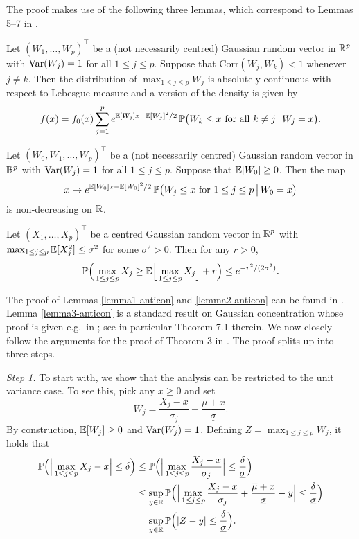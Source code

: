  
The proof makes use of the following three lemmas, which correspond to Lemmas 5--7 in \cite{Chernozhukov2015}. 
\begin{lemmaA}\label{lemma1-anticon}
Let $(W_1,\ldots,W_p)^\top$ be a (not necessarily centred) Gaussian random vector in $\mathbb{R}^p$ with $\textnormal{Var}(W_j) = 1$ for all $1 \le j \le p$. Suppose that $\text{Corr}(W_j,W_k) < 1$ whenever $j \ne k$. Then the distribution of $\max_{1 \le j \le p} W_j$ is absolutely continuous with respect to Lebesgue measure and a version of the density is given by 
\[ f(x) = f_0(x) \sum\limits_{j=1}^p e^{\mathbb{E}[W_j]x - \mathbb{E}[W_j]^2/2} \, \mathbb{P} \big(W_k \le x \text{ for all } k \ne j \, \big| \, W_j = x \big). \]
\end{lemmaA}
\begin{lemmaA}\label{lemma2-anticon}
Let $(W_0,W_1,\ldots,W_p)^\top$ be a (not necessarily centred) Gaussian random vector in $\mathbb{R}^p$ with $\textnormal{Var}(W_j) = 1$ for all $1 \le j \le p$. Suppose that $\mathbb{E}[W_0] \ge 0$. Then the map 
\[ x \mapsto  e^{\mathbb{E}[W_0]x - \mathbb{E}[W_0]^2/2} \, \mathbb{P} \big(W_j \le x \text{ for } 1 \le j \le p \, \big| \, W_0 = x \big) \]
is non-decreasing on $\mathbb{R}$. 
\end{lemmaA}
\begin{lemmaA}\label{lemma3-anticon}
Let $(X_1,\ldots,X_p)^\top$ be a centred Gaussian random vector in $\mathbb{R}^p$ with $\max_{1 \le j \le p} \mathbb{E}[X_j^2] \le \sigma^2$ for some $\sigma^2 > 0$. Then for any $r > 0$, 
\[ \mathbb{P} \Big( \max_{1 \le j \le p} X_j \ge \mathbb{E} \Big[ \max_{1 \le j \le p} X_j \Big] + r \Big) \le e^{-r^2/(2\sigma^2)}. \]
\end{lemmaA} 
The proof of Lemmas \ref{lemma1-anticon} and \ref{lemma2-anticon} can be found in \cite{Chernozhukov2015}. Lemma \ref{lemma3-anticon} is a standard result on Gaussian concentration whose proof is given e.g.\ in \cite{Ledoux2001}; see in particular Theorem 7.1 therein. We now closely follow the arguments for the proof of Theorem 3 in \cite{Chernozhukov2015}. The proof splits up into three steps. 
\vspace{7pt}


\textit{Step 1.} To start with, we show that the analysis can be restricted to the unit variance case. To see this, pick any $x \ge 0$ and set 
\[ W_j = \frac{X_j - x}{\sigma_j} + \frac{\overline{\mu} + x}{\underline{\sigma}}. \]
By construction, $\mathbb{E}[W_j] \ge 0$ and $\textnormal{Var}(W_j) = 1$. Defining $Z = \max_{1 \le j \le p} W_j$, it holds that  
\begin{align*}
\mathbb{P} \Big( \Big| \max_{1 \le j \le p} X_j - x \Big| \le \delta \Big) 
 & \le \mathbb{P} \Big( \Big| \max_{1 \le j \le p} \frac{X_j - x}{\sigma_j} \Big| \le \frac{\delta}{\underline{\sigma}} \Big) \\
 & \le \sup_{y \in \mathbb{R}} \mathbb{P} \Big( \Big| \max_{1 \le j \le p} \frac{X_j - x}{\sigma_j} + \frac{\overline{\mu} + x}{\underline{\sigma}} - y \Big| \le \frac{\delta}{\underline{\sigma}} \Big) \\
 & = \sup_{y \in \mathbb{R}} \mathbb{P} \Big( |Z - y| \le \frac{\delta}{\underline{\sigma}} \Big). 
\end{align*}


